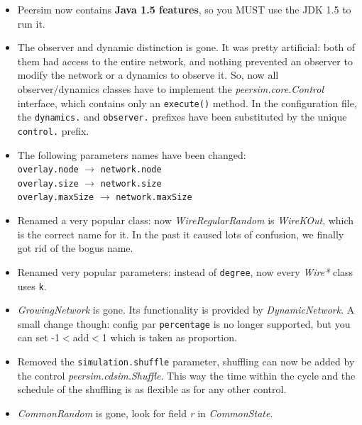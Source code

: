 \documentclass[a4paper,11pt]{article}
\begin{document}
\begin{itemize}

\item Peersim now contains \textbf{Java 1.5 features}, so you MUST use
  the JDK 1.5 to run it. 

\item The observer and dynamic distinction is gone. It was pretty artificial:
  both of them had access to the entire network, and nothing prevented
  an observer to modify the network or a dynamics to observe it. So,
  now all observer/dynamics classes have to implement the 
  \emph{peersim.core.Control} interface, which contains only an
  \texttt{execute()} 
  method. In the configuration file, the \texttt{dynamics.} and
  \texttt{observer.} 
  prefixes have been substituted by the unique \texttt{control.} prefix. 

\item The following parameters names have been changed:\\
  \texttt{overlay.node} $\to$ \texttt{network.node}\\
  \texttt{overlay.size} $\to$ \texttt{network.size}\\
  \texttt{overlay.maxSize} $\to$ \texttt{network.maxSize}

\item Renamed a very popular class: now \emph{WireRegularRandom} is
  \emph{WireKOut}, which 
  is the correct name for it. In the past it caused lots of confusion, we
  finally got rid of the bogus name.

\item Renamed very popular parameters: instead of \texttt{degree}, now
  every \emph{Wire*}  
  class uses \texttt{k}.

\item \emph{GrowingNetwork} is gone. Its functionality is provided by 
  \emph{DynamicNetwork}. A small change though: config par
  \texttt{percentage} is no longer  
  supported, but you can set -1$<$add$<$1 which is taken as proportion.

\item Removed the \texttt{simulation.shuffle} parameter, shuffling can now be
  added by the control \emph{peersim.cdsim.Shuffle}. This way the time
  within the cycle and 
  the schedule of the shuffling is as flexible as for any other control.

\item \emph{CommonRandom} is gone, look for field \emph{r} in
  \emph{CommonState}.


\end{itemize}
\end{document}
